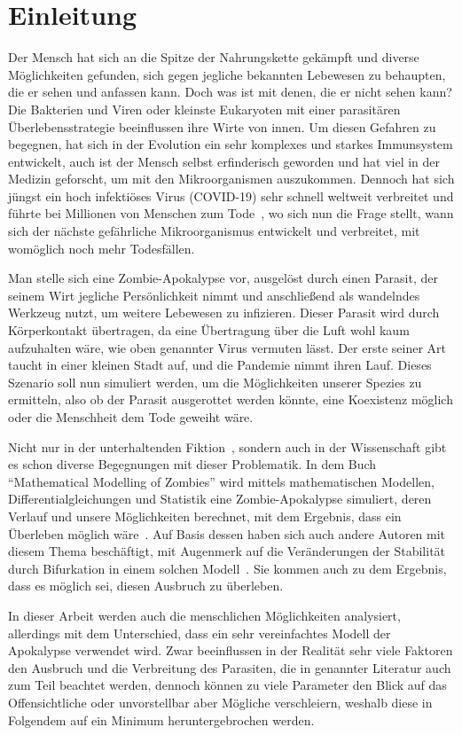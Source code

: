 \section{Einleitung} %
    \label{sec:einleitung}
    Der Mensch hat sich an die Spitze der Nahrungskette gekämpft und diverse Möglichkeiten gefunden, sich gegen jegliche bekannten Lebewesen zu behaupten, die er sehen und anfassen kann. Doch was ist mit denen, die er nicht sehen kann? Die Bakterien und Viren oder kleinste Eukaryoten mit einer parasitären Überlebensstrategie beeinflussen ihre Wirte von innen. Um diesen Gefahren zu begegnen, hat sich in der Evolution ein sehr komplexes und starkes Immunsystem entwickelt, auch ist der Mensch selbst erfinderisch geworden und hat viel in der Medizin geforscht, um mit den Mikroorganismen auszukommen. Dennoch hat sich jüngst ein hoch infektiöses Virus (COVID-19) sehr schnell weltweit verbreitet und führte bei Millionen von Menschen zum Tode\ \cite[vgl.][]{corona}, wo sich nun die Frage stellt, wann sich der nächste gefährliche Mikroorganismus entwickelt und verbreitet, mit womöglich noch mehr Todesfällen.

    Man stelle sich eine Zombie-Apokalypse vor, ausgelöst durch einen Parasit, der seinem Wirt jegliche Persönlichkeit nimmt und anschließend als wandelndes Werkzeug nutzt, um weitere Lebewesen zu infizieren. Dieser Parasit wird durch Körperkontakt übertragen, da eine Übertragung über die Luft wohl kaum aufzuhalten wäre, wie oben genannter Virus vermuten lässt. Der erste seiner Art taucht in einer kleinen Stadt auf, und die Pandemie nimmt ihren Lauf. Dieses Szenario soll nun simuliert werden, um die Möglichkeiten unserer Spezies zu ermitteln, also ob der Parasit ausgerottet werden könnte, eine Koexistenz möglich oder die Menschheit dem Tode geweiht wäre.

    Nicht nur in der unterhaltenden Fiktion\ \cite{zombie_fiction}, sondern auch in der Wissenschaft gibt es schon diverse Begegnungen mit dieser Problematik. In dem Buch ``Mathematical Modelling of Zombies'' wird mittels mathematischen Modellen, Differentialgleichungen und Statistik eine Zombie-Apokalypse simuliert, deren Verlauf und unsere Möglichkeiten berechnet, mit dem Ergebnis, dass ein Überleben möglich wäre\ \cite{zombie_smith}. Auf Basis dessen haben sich auch andere Autoren mit diesem Thema beschäftigt, mit Augenmerk auf die Veränderungen der Stabilität durch Bifurkation in einem solchen Modell\ \cite[vgl.][]{zombie_science2}. Sie kommen auch zu dem Ergebnis, dass es möglich sei, diesen Ausbruch zu überleben.

    In dieser Arbeit werden auch die menschlichen Möglichkeiten analysiert, allerdings mit dem Unterschied, dass ein sehr vereinfachtes Modell der Apokalypse verwendet wird. Zwar beeinflussen in der Realität sehr viele Faktoren den Ausbruch und die Verbreitung des Parasiten, die in genannter Literatur auch zum Teil beachtet werden, dennoch können zu viele Parameter den Blick auf das Offensichtliche oder unvorstellbar aber Mögliche verschleiern, weshalb diese in Folgendem auf ein Minimum heruntergebrochen werden.
